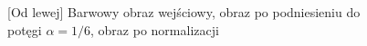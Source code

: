 \documentclass[a4paper,12pt, titlepage]{report}
\begin{document}
\begin{figure}[h]
    \centering
    \caption{[Od lewej] Barwowy obraz wejściowy, obraz po podniesieniu do potęgi \(\alpha=1/6\), obraz po normalizacji}%
    \label{fig:rysunek}%
\end{figure}
\FloatBarrier
\end{document}
